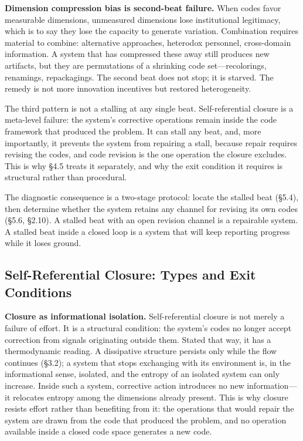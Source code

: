 \documentclass[11pt,a4paper]{article}
\begin{document}
\textbf{Dimension compression bias is second-beat failure.} When codes favor measurable dimensions, unmeasured dimensions lose institutional legitimacy, which is to say they lose the capacity to generate variation. Combination requires material to combine: alternative approaches, heterodox personnel, cross-domain information. A system that has compressed these away still produces new artifacts, but they are permutations of a shrinking code set---recolorings, renamings, repackagings. The second beat does not stop; it is starved. The remedy is not more innovation incentives but restored heterogeneity.

The third pattern is not a stalling at any single beat. Self-referential closure is a meta-level failure: the system's corrective operations remain inside the code framework that produced the problem. It can stall any beat, and, more importantly, it prevents the system from repairing a stall, because repair requires revising the codes, and code revision is the one operation the closure excludes. This is why \S4.5 treats it separately, and why the exit condition it requires is structural rather than procedural.

The diagnostic consequence is a two-stage protocol: locate the stalled beat (\S5.4), then determine whether the system retains any channel for revising its own codes (\S5.6, \S2.10). A stalled beat with an open revision channel is a repairable system. A stalled beat inside a closed loop is a system that will keep reporting progress while it loses ground.

\subsection{Self-Referential Closure: Types and Exit Conditions}

\textbf{Closure as informational isolation.} Self-referential closure is not merely a failure of effort. It is a structural condition: the system's codes no longer accept correction from signals originating outside them. Stated that way, it has a thermodynamic reading. A dissipative structure persists only while the flow continues (\S3.2); a system that stops exchanging with its environment is, in the informational sense, isolated, and the entropy of an isolated system can only increase. Inside such a system, corrective action introduces no new information---it relocates entropy among the dimensions already present. This is why closure resists effort rather than benefiting from it: the operations that would repair the system are drawn from the code that produced the problem, and no operation available inside a closed code space generates a new code.
\end{document}
